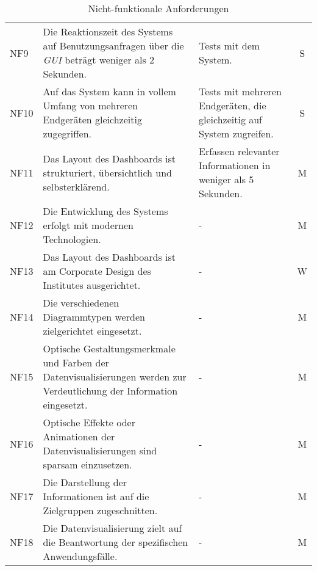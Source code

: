 \begin{table}[h]
\begin{adjustbox}{max width=\textwidth}
\begin{tabular}{lp{7.5cm}p{7.5cm}c}
        NF9                              &Die Reaktionszeit des Systems auf Benutzungsanfragen über die \textit{\acrshort{GUI}} beträgt weniger als 2 Sekunden. & Tests mit dem System.& S\\
        NF10                              &Auf das System kann in vollem Umfang von mehreren Endgeräten gleichzeitig zugegriffen. & Tests mit mehreren Endgeräten, die gleichzeitig auf System zugreifen.& S\\
        NF11                              &Das Layout des Dashboards ist strukturiert, übersichtlich und selbsterklärend. & Erfassen relevanter Informationen in weniger als 5 Sekunden.& M\\
        NF12                              &Die Entwicklung des Systems erfolgt mit modernen Technologien. & - & M\\
        NF13                              &Das Layout des Dashboards ist am Corporate Design des Institutes ausgerichtet. & -& W\\
        NF14                              &Die verschiedenen Diagrammtypen werden zielgerichtet eingesetzt. & -& M\\
        NF15                              &Optische Gestaltungsmerkmale und Farben der Datenvisualisierungen werden zur Verdeutlichung der Information eingesetzt. &- & M\\
        NF16                              &Optische Effekte oder Animationen der Datenvisualisierungen sind sparsam einzusetzen. & -& M\\
        NF17                              &Die Darstellung der Informationen ist auf die Zielgruppen zugeschnitten. & -& M\\
        NF18                              &Die Datenvisualisierung zielt auf die Beantwortung der spezifischen Anwendungsfälle. & -& M\\
       \bottomrule
    \end{tabular}
    \end{adjustbox}
    \caption{%
        Nicht-funktionale Anforderungen
    }
    \label{tab: nfAnforderungen}
    \end{table}
\endgroup
